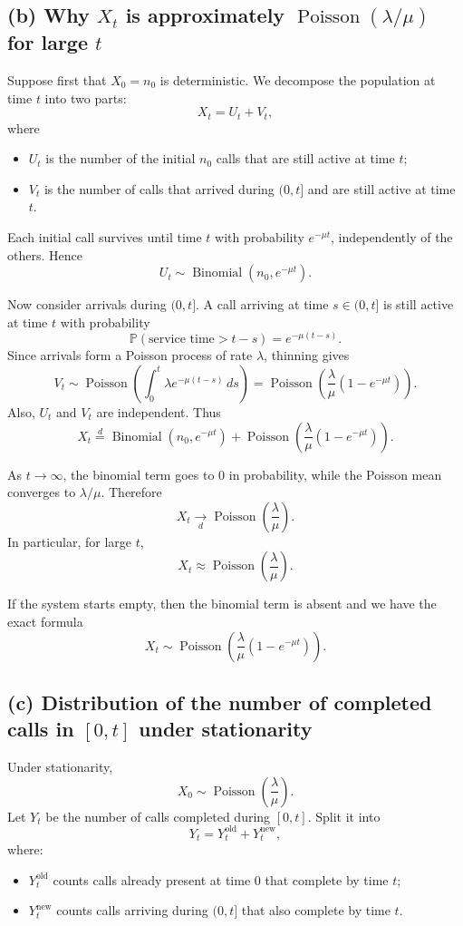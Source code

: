 \documentclass[11pt,a4paper]{article}
\newcommand{\Pois}{\operatorname{Poisson}}
\newcommand{\Pbb}{\mathbb{P}}
\newcommand{\1}{\mathbf{1}}
\begin{document}
\subsection*{(b) Why $X_t$ is approximately $\Pois(\lambda/\mu)$ for large $t$}
Suppose first that $X_0=n_0$ is deterministic. We decompose the population at time $t$ into two parts:
\[
X_t=U_t+V_t,
\]
where
\begin{itemize}
  \item $U_t$ is the number of the initial $n_0$ calls that are still active at time $t$;
  \item $V_t$ is the number of calls that arrived during $(0,t]$ and are still active at time $t$.
\end{itemize}

Each initial call survives until time $t$ with probability $e^{-\mu t}$, independently of the others. Hence
\[
U_t\sim \operatorname{Binomial}(n_0,e^{-\mu t}).
\]

Now consider arrivals during $(0,t]$. A call arriving at time $s\in(0,t]$ is still active at time $t$ with probability
\[
\Pbb(\text{service time}>t-s)=e^{-\mu(t-s)}.
\]
Since arrivals form a Poisson process of rate $\lambda$, thinning gives
\[
V_t\sim \Pois\!\left(\int_0^t \lambda e^{-\mu(t-s)}\,ds\right)
=\Pois\!\left(\frac{\lambda}{\mu}(1-e^{-\mu t})\right).
\]
Also, $U_t$ and $V_t$ are independent. Thus
\[
X_t\overset{d}= \operatorname{Binomial}(n_0,e^{-\mu t})
+\Pois\!\left(\frac{\lambda}{\mu}(1-e^{-\mu t})\right).
\]

As $t\to\infty$, the binomial term goes to $0$ in probability, while the Poisson mean converges to $\lambda/\mu$. Therefore
\[
X_t \xrightarrow[d]{} \Pois\!\left(\frac{\lambda}{\mu}\right).
\]
In particular, for large $t$,
\[
X_t\approx \Pois\!\left(\frac{\lambda}{\mu}\right).
\]

If the system starts empty, then the binomial term is absent and we have the exact formula
\[
X_t\sim \Pois\!\left(\frac{\lambda}{\mu}(1-e^{-\mu t})\right).
\]

\subsection*{(c) Distribution of the number of completed calls in $[0,t]$ under stationarity}
Under stationarity,
\[
X_0\sim \Pois\!\left(\frac{\lambda}{\mu}\right).
\]
Let $Y_t$ be the number of calls completed during $[0,t]$. Split it into
\[
Y_t=Y_t^{\text{old}}+Y_t^{\text{new}},
\]
where:
\begin{itemize}
  \item $Y_t^{\text{old}}$ counts calls already present at time $0$ that complete by time $t$;
  \item $Y_t^{\text{new}}$ counts calls arriving during $(0,t]$ that also complete by time $t$.
\end{itemize}
\end{document}
